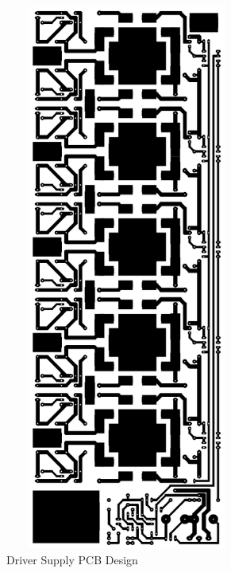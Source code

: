 \documentclass[12pt,a4paper]{report}
\begin{document}
\begin{minipage}{8cm}
	\begin{figure}[H]
		\begin{center}
			\includegraphics[width=8cm,height=18cm]{figures/design.png}
		\end{center}
			\caption{Driver Supply PCB Design}
	\end{figure}
\end{minipage}

\clearpage
\end{document}
